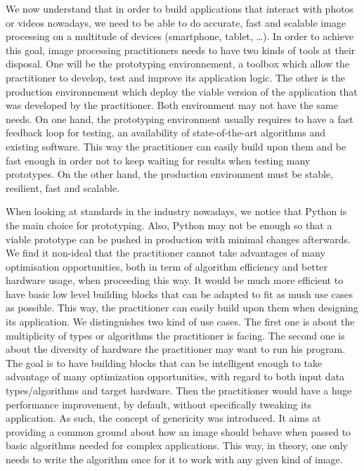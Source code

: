 We now understand that in order to build applications that interact with photos or videos nowadays, we need to be able
to do accurate, fast and scalable image processing on a multitude of devices (smartphone, tablet, \ldots). In order to
achieve this goal, image processing practitioners needs to have two kinds of tools at their disposal. One will be the
prototyping environnement, a toolbox which allow the practitioner to develop, test and improve its application logic.
The other is the production environnement which deploy the viable version of the application that was developed by the
practitioner. Both environment may not have the same needs. On one hand, the prototyping environment usually requires to
have a fast feedback loop for testing, an availability of state-of-the-art algorithms and existing software. This way
the practitioner can easily build upon them and be fast enough in order not to keep waiting for results when testing
many prototypes. On the other hand, the production environment must be stable, resilient, fast and scalable.

When looking at standards in the industry nowadays, we notice that Python is the main choice for prototyping. Also,
Python may not be enough so that a viable prototype can be pushed in production with minimal changes afterwards. We find
it non-ideal that the practitioner cannot take advantages of many optimisation opportunities, both in term of algorithm
efficiency and better hardware usage, when proceeding this way. It would be much more efficient to have basic low level
building blocks that can be adapted to fit as mush use cases as possible. This way, the practitioner can easily build
upon them when designing its application. We distinguishes two kind of use cases. The first one is about the
multiplicity of types or algorithms the practitioner is facing. The second one is about the diversity of hardware the
practitioner may want to run his program. The goal is to have building blocks that can be intelligent enough to take
advantage of many optimization opportunities, with regard to both input data types/algorithms and target hardware. Then
the practitioner would have a huge performance improvement, by default, without specifically tweaking its application.
As such, the concept of genericity was introduced. It aims at providing a common ground about how an image should behave
when passed to basic algorithms needed for complex applications. This way, in theory, one only needs to write the
algorithm once for it to work with any given kind of image.

